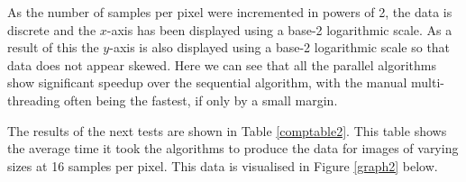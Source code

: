 \documentclass[12pt,journal,transmag]{IEEEtran}
\begin{document}
	As the number of samples per pixel were incremented in powers of 2, the data is discrete and the $x$-axis has been displayed using a base-2 logarithmic scale. As a result of this the $y$-axis is also displayed using a base-2 logarithmic scale so that data does not appear skewed. Here we can see that all the parallel algorithms show significant speedup over the sequential algorithm, with the manual multi-threading often being the fastest, if only by a small margin.
	
	The results of the next tests are shown in Table \ref{comptable2}. This table shows the average time it took the algorithms to produce the data for images of varying sizes at 16 samples per pixel. This data is visualised in Figure \ref{graph2} below.

	\begin{table}[!h]
		\caption{16 Spp Image Generation Performance Comparison}
		\label{comptable2}
		\centering
	\end{table}
	
\end{document}
